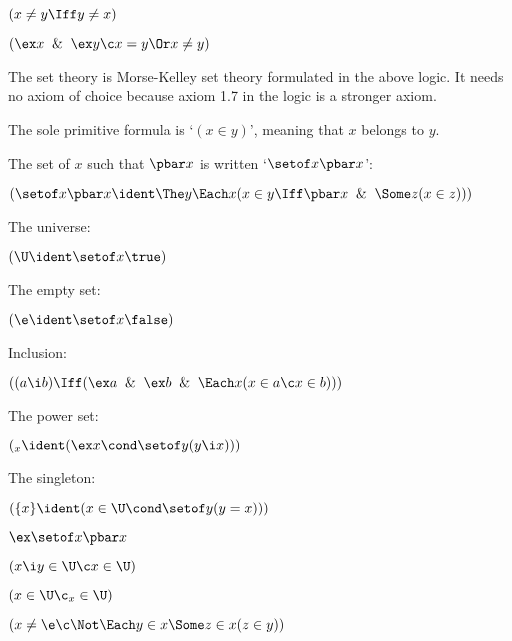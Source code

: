  $(x \ne y \Iff y \ne x)$

 $(\ex x \And \ex y \c x = y \Or x \ne y)$

\lineb


\vfill\eject
{}

The set theory is Morse-Kelley set theory formulated in the above logic.
It needs no axiom of choice because axiom 1.7 
in the logic is a stronger axiom.
\lineb  


The sole primitive formula is `$(x \in y)$', meaning that $x$ belongs to $y$.
\lineb  


\noparse\noindent{}The set of $x$ such that $\pbar x$ is written `$\setof x \pbar x$':  

 $(\setof x \pbar x \ident 
\The y\Each x (x \in y \Iff \pbar x \And \Some z (x \in z)))$

\noindent{}The universe: 

 $(\U \ident \setof x \true)$

\noindent{}The empty set: 

 $(\e \ident \setof x \false)$

\noindent{}Inclusion:

 $((a \i b) \Iff (\ex a \And \ex b \And \Each x (x \in a \c x \in b)))$

\noindent{}The power set:

 $(\sb x \ident (\ex x \cond \setof y (y \i x)))$

\noindent{}The singleton:

 $(\{x\} \ident (x \in \U \cond \setof y (y = x)))$ 
\lineb



 $\ex \setof x \pbar x$
\lineb



 $(x \i y \in \U \c x \in \U)$
\lineb


 $(x \in \U \c \sb x \in \U)$
\lineb


 $(x \ne \e \c \Not \Each y \in x \Some z \in x (z \in y))$
\lineb



